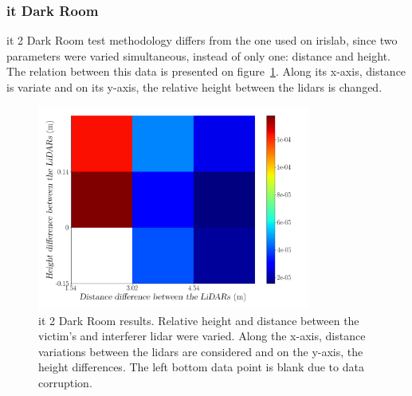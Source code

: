 

\subsubsection{\ac{it} Dark Room}
\ac{it} 2 Dark Room test methodology differs from the one used on \ac{irislab}, since two parameters were varied simultaneous, instead of only one: distance and height. The relation between this data is presented on figure~\ref{fig:box-filter-outliers-it2}. Along its x-axis, distance is variate and on its y-axis, the relative height between the \acp{lidar} is changed.

\begin{figure}[!ht]
\centering
\includegraphics[width=0.8\textwidth]{img/lidar-interference/box-filtering/interference-box-filter-outliers-it2.png}
\caption{\ac{it} 2 Dark Room results. Relative height and distance between the victim's and interferer \ac{lidar} were varied. Along the x-axis, distance variations between the \acp{lidar} are considered and on the y-axis, the height differences. The left bottom data point is blank due to data corruption.}
\label{fig:box-filter-outliers-it2}
\end{figure}

